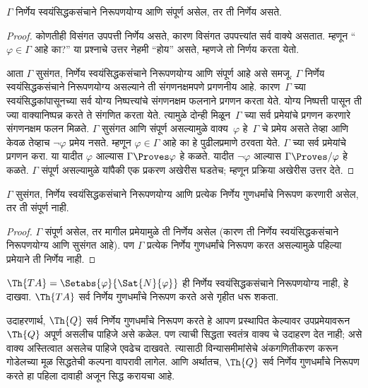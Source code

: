 \begin{thm}
$\Gamma$ निर्णेय स्वयंसिद्धकसंचाने निरूपणयोग्य आणि संपूर्ण असेल, तर ती
निर्णेय असते.
\end{thm}

\begin{proof}
कोणतीही विसंगत उपपत्ती निर्णेय असते, कारण विसंगत
उपपत्त्यांत सर्व वाक्ये असतात. म्हणून ``$\varphi \in
\Gamma$ आहे का?'' या प्रश्नाचे उत्तर नेहमी ``होय'' असते,
म्हणजे तो निर्णय करता येतो.

आता $\Gamma$ सुसंगत, निर्णेय स्वयंसिद्धकसंचाने निरूपणयोग्य आणि संपूर्ण आहे
असे समजू. $\Gamma$ निर्णेय स्वयंसिद्धकसंचाने निरूपणयोग्य असल्याने ती
संगणनक्षमपणे प्रगणनीय आहे. कारण~$\Gamma$ च्या
स्वयंसिद्धकांपासूनच्या सर्व योग्य निष्पत्त्यांचे संगणनक्षम
फलनाने प्रगणन करता येते. योग्य निष्पत्ती पासून ती ज्या
वाक्यानिष्पन्न करते ते संगणित करता येते. त्यामुळे
दोन्ही मिळून~$\Gamma$ च्या सर्व प्रमेयांचे प्रगणन करणारे
संगणनक्षम फलन मिळते. $\Gamma$ सुसंगत आणि संपूर्ण असल्यामुळे
वाक्य~$\varphi$ हे~$\Gamma$ चे प्रमेय असते तेव्हा आणि केवळ तेव्हाच
$\lnot \varphi$ प्रमेय नसते. म्हणून $\varphi \in
\Gamma$ आहे का हे पुढीलप्रमाणे ठरवता येते. $\Gamma$ च्या सर्व
प्रमेयांचे प्रगणन करा. या यादीत $\varphi$ आल्यास $\Gamma \Proves \varphi$
हे कळते. यादीत $\lnot
\varphi$ आल्यास $\Gamma \Proves/ \varphi$ हे कळते. $\Gamma$
संपूर्ण असल्यामुळे यांपैकी एक प्रकरण अखेरीस घडतेच;
म्हणून प्रक्रिया अखेरीस उत्तर देते.
\end{proof}

\begin{cor}
\label{inc:int:dec:cor:incompleteness}
$\Gamma$ सुसंगत, निर्णेय स्वयंसिद्धकसंचाने निरूपणयोग्य आणि प्रत्येक निर्णेय
गुणधर्मांचे निरूपण करणारी असेल, तर ती संपूर्ण नाही.
\end{cor}

\begin{proof}
$\Gamma$ संपूर्ण असेल, तर मागील प्रमेयामुळे ती
निर्णेय असेल (कारण ती निर्णेय स्वयंसिद्धकसंचाने निरूपणयोग्य आणि सुसंगत आहे).
पण $\Gamma$ प्रत्येक निर्णेय गुणधर्मांचे निरूपण
करत असल्यामुळे पहिल्या प्रमेयाने ती निर्णेय नाही.
\end{proof}

\begin{prob}
$\Th{TA} = \Setabs{\varphi}{\Sat{N}{\varphi}}$ ही निर्णेय स्वयंसिद्धकसंचाने निरूपणयोग्य
नाही, हे दाखवा. $\Th{TA}$ सर्व निर्णेय गुणधर्मांचे निरूपण करते
असे गृहीत धरू शकता.
\end{prob}

उदाहरणार्थ, $\Th{Q}$ सर्व निर्णेय गुणधर्मांचे निरूपण
करते हे आपण प्रस्थापित केल्यावर उपप्रमेयावरून $\Th{Q}$ अपूर्ण
असलीच पाहिजे असे कळेल. पण त्याची सिद्धता स्वतंत्र वाक्य
चे उदाहरण देत नाही; असे वाक्य अस्तित्वात असलेच पाहिजे
एवढेच दाखवते. त्यासाठी विन्यासमीमांसेचे अंकगणितीकरण करून
गोडेलच्या मूळ सिद्धतेची कल्पना वापरावी लागेल. आणि अर्थातच,
$\Th{Q}$ सर्व निर्णेय गुणधर्मांचे निरूपण करते हा
पहिला दावाही अजून सिद्ध करायचा आहे.

